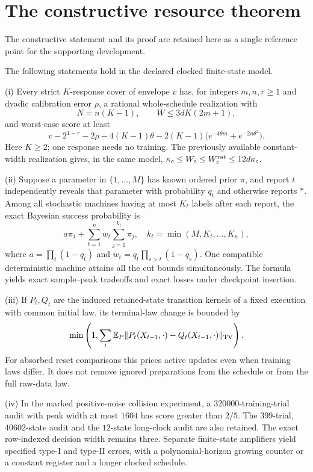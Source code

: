 \section{The constructive resource theorem}
\label{sec:v23-preserved-main}
The constructive statement and its proof are retained here as a single reference point for the supporting development.

\begin{theorem}
\label{thm:v22-main}
The following statements hold in the declared clocked finite-state
model.

\smallskip\noindent
\textup{(i)} Every strict $K$-response cover of envelope $v$ has, for
integers $m,n,r\ge1$ and dyadic calibration error $\rho$, a rational
whole-schedule realization with
\[
 N=n(K-1),\qquad W\le3dK(2m+1),
\]
and worst-case score at least
\[
 v-2^{1-r}-2\rho-4(K-1)\theta
       -2(K-1)\bigl(e^{-4\theta m}+e^{-2n\theta^2}\bigr).
\]
Here $K\ge2$; one response needs no training. The previously available
constant-width realization gives, in the same model,
$\kappa_c\le W_c\le W_c^{\rm rat}\le12d\kappa_c$.

\smallskip\noindent
\textup{(ii)} Suppose a parameter in $\{1,\ldots,M\}$ has known ordered
prior $\pi$, and report $t$ independently reveals that parameter with
probability $q_t$ and otherwise reports $*$. Among all stochastic
machines having at most $K_t$ labels after each report, the exact
Bayesian success probability is
\[
 a\pi_1+\sum_{t=1}^n w_t\sum_{j=1}^{k_t}\pi_j,
 \quad
 k_t=\min(M,K_t,\ldots,K_n),
\]
where $a=\prod_t(1-q_t)$ and
$w_t=q_t\prod_{s>t}(1-q_s)$. One compatible deterministic machine
attains all the cut bounds simultaneously. The formula yields exact
sample--peak tradeoffs and exact losses under checkpoint insertion.

\smallskip\noindent
\textup{(iii)} If $P_t,Q_t$ are the induced retained-state transition
kernels of a fixed execution with common initial law, its terminal-law
change is bounded by
\[
 \min\left(1,\sum_t\mathbb E_P
           \|P_t(X_{t-1},\cdot)-Q_t(X_{t-1},\cdot)\|_{\mathrm{TV}}\right).
\]
For absorbed reset comparisons this prices active updates even when
training laws differ. It does not remove ignored preparations from
the schedule or from the full raw-data law.

\smallskip\noindent
\textup{(iv)} In the marked positive-noise collision experiment, a
$320000$-training-trial audit with peak width at most $1604$ has score
greater than $2/5$. The $399$-trial, $40602$-state audit and the
$12$-state long-clock audit are also retained. The exact row-indexed
decision width remains three. Separate finite-state amplifiers yield
specified type-I and type-II errors, with a polynomial-horizon growing
counter or a constant register and a longer clocked schedule.
\end{theorem}
